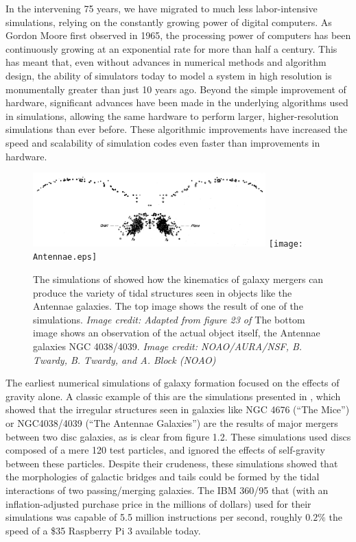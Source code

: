 In the intervening 75 years, we have migrated to much less labor-intensive
simulations, relying on the constantly growing power of digital computers.  As
Gordon Moore first observed in 1965, the processing power of computers has been
continuously growing at an exponential rate for more than half a century.  This
has meant that, even without advances in numerical methods and algorithm design,
the ability of simulators today to model a system in high resolution is
monumentally greater than just 10 years ago.  Beyond the simple improvement of
hardware, significant advances have been made in the underlying algorithms used
in simulations, allowing the same hardware to perform larger, higher-resolution
simulations than ever before.  These algorithmic improvements have increased the
speed and scalability of simulation codes even faster than improvements in
hardware.

\begin{figure}
    \includegraphics[width=0.8\textwidth]{Toomre.eps}
    \texttt{[image: Antennae.eps]}
    \caption[Early simulation of Antennae Galaxies]{The simulations of
    \citet{Toomre1972} showed how the kinematics of galaxy mergers can produce
    the variety of tidal structures seen in objects like the Antennae galaxies.
    The top image shows the result of one of the \citet{Toomre1972} simulations.
    \textit{Image credit: Adapted from figure 23 of \citet{Toomre1972}}
    The bottom image shows an observation of the actual object itself, the
    Antennae galaxies NGC 4038/4039. \textit{Image credit: NOAO/AURA/NSF, B.
    Twardy, B. Twardy, and A. Block (NOAO)}}
\end{figure}

The earliest numerical simulations of galaxy formation focused on the effects of
gravity alone.  A classic example of this are the simulations presented in
\citet{Toomre1972}, which showed that the irregular structures seen in galaxies
like NGC 4676 (``The Mice'') or NGC4038/4039 (``The Antennae Galaxies'') are the
results of major mergers between two disc galaxies, as is clear from figure 1.2.
These simulations used discs composed of a mere 120 test particles, and ignored
the effects of self-gravity between these particles.  Despite their crudeness,
these simulations showed that the morphologies of galactic bridges and tails could be
formed by the tidal interactions of two passing/merging galaxies.  The IBM
360/95 that \citet{Toomre1972} (with an inflation-adjusted purchase price in the
millions of dollars) used for their simulations was capable of 5.5 million
instructions per second, roughly $0.2\%$ the speed of a \$35 Raspberry Pi 3
available today.

